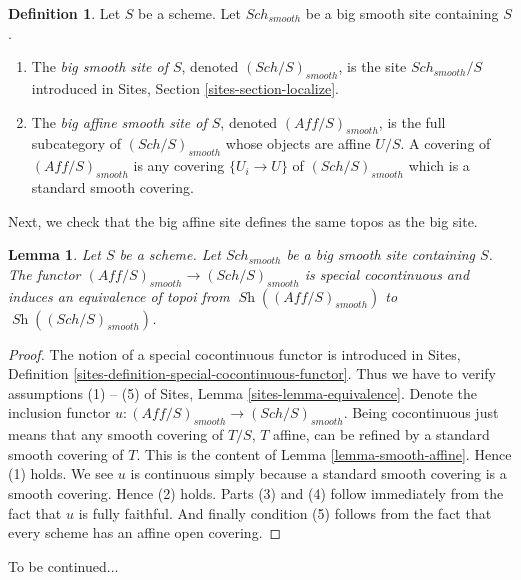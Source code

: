 \documentclass{stacks-project}
\theoremstyle{plain}
\newtheorem{lemma}[subsection]{Lemma}
\theoremstyle{definition}
\newtheorem{definition}[subsection]{Definition}
\theoremstyle{remark}
\numberwithin{equation}{subsection}
\def\Sch{\mathit{Sch}}
\def\Sh{\mathop{\mathit{Sh}}\nolimits}
\begin{document}
\begin{definition}
\label{definition-big-small-smooth}
Let $S$ be a scheme. Let $\Sch_{smooth}$ be a big smooth
site containing $S$.
\begin{enumerate}
\item The {\it big smooth site of $S$}, denoted
$(\Sch/S)_{smooth}$, is the site $\Sch_{smooth}/S$
introduced in Sites, Section \ref{sites-section-localize}.
\item The {\it big affine smooth site of $S$}, denoted
$(\textit{Aff}/S)_{smooth}$, is the full subcategory of
$(\Sch/S)_{smooth}$ whose objects are affine $U/S$.
A covering of $(\textit{Aff}/S)_{smooth}$ is any covering
$\{U_i \to U\}$ of $(\Sch/S)_{smooth}$ which is a
standard smooth covering.
\end{enumerate}
\end{definition}

\noindent
Next, we check that the big affine site defines the same
topos as the big site.

\begin{lemma}
\label{lemma-affine-big-site-smooth}
Let $S$ be a scheme. Let $\Sch_{smooth}$ be a big smooth
site containing $S$.
The functor
$(\textit{Aff}/S)_{smooth} \to (\Sch/S)_{smooth}$
is special cocontinuous and induces an equivalence of topoi from
$\Sh((\textit{Aff}/S)_{smooth})$ to
$\Sh((\Sch/S)_{smooth})$.
\end{lemma}

\begin{proof}
The notion of a special cocontinuous functor is introduced in
Sites, Definition \ref{sites-definition-special-cocontinuous-functor}.
Thus we have to verify assumptions (1) -- (5) of
Sites, Lemma \ref{sites-lemma-equivalence}.
Denote the inclusion functor
$u : (\textit{Aff}/S)_{smooth} \to (\Sch/S)_{smooth}$.
Being cocontinuous just means that any smooth covering of
$T/S$, $T$ affine, can be refined by a standard smooth covering of $T$.
This is the content of
Lemma \ref{lemma-smooth-affine}.
Hence (1) holds. We see $u$ is continuous simply because a standard
smooth covering is a smooth covering. Hence (2) holds.
Parts (3) and (4) follow immediately from the fact that $u$ is
fully faithful. And finally condition (5) follows from the
fact that every scheme has an affine open covering.
\end{proof}

\noindent
To be continued...
\end{document}
